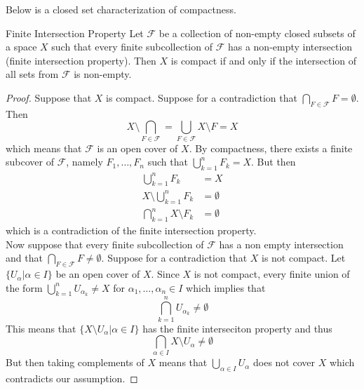 \documentclass[a4paper]{article}
\begin{document}
Below is a closed set characterization of compactness. 

\begin{thm}{Finite Intersection Property}{} Let $\mathcal{F}$ be a collection of non-empty closed subsets of a space $X$ such that every finite subcollection of $\mathcal{F}$ has a non-empty intersection (finite intersection property). Then $X$ is compact if and only if the intersection of all sets from $\mathcal{F}$ is non-empty. 
\begin{proof}
Suppose that $X$ is compact. Suppose for a contradiction that $\bigcap_{F\in\mathcal{F}}F=\emptyset$. Then $$X\setminus\bigcap_{F\in\mathcal{F}}=\bigcup_{F\in\mathcal{F}}X\setminus F=X$$ which means that $\mathcal{F}$ is an open cover of $X$. By compactness, there exists a finite subcover of $\mathcal{F}$, namely $F_1,\dots, F_n$ such that $\bigcup_{k=1}^nF_k=X$. But then 
\begin{align*}
\bigcup_{k=1}^nF_k&=X\\
X\setminus\bigcup_{k=1}^nF_k&=\emptyset\\
\bigcap_{k=1}^nX\setminus F_k&=\emptyset
\end{align*}
which is a contradiction of the finite intersection property. \\
Now suppose that every finite subcollection of $\mathcal{F}$ has a non empty intersection and that $\bigcap_{F\in\mathcal{F}}F\neq\emptyset$. Suppose for a contradiction that $X$ is not compact. Let $\{U_\alpha|\alpha\in I\}$ be an open cover of $X$. Since $X$ is not compact, every finite union of the form $\bigcup_{k=1}^nU_{\alpha_k}\neq X$ for $\alpha_1,\dots,\alpha_n\in I$ which implies that $$\bigcap_{k=1}^nU_{\alpha_k}\neq\emptyset$$ This means that $\{X\setminus U_\alpha|\alpha\in I\}$ has the finite interseciton property and thus $$\bigcap_{\alpha\in I}X\setminus U_\alpha\neq\emptyset$$ But then taking complements of $X$ means that $\bigcup_{\alpha\in I}U_\alpha$ does not cover $X$ which contradicts our assumption. 
\end{proof}
\end{thm}
\end{document}
